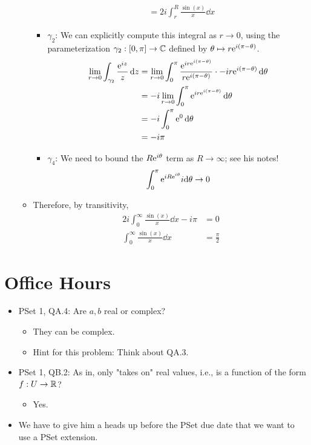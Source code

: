 \documentclass[../notes.tex]{subfiles}
\begin{document}
\begin{itemize}
\begin{itemize}
\begin{itemize}
\begin{align*}
                &= 2i\int_r^R\frac{\sin(x)}{x}\dd{x}
            \end{align*}
            \item $\gamma_2$: We can explicitly compute this integral as $r\to 0$, using the parameterization $\gamma_2:[0,\pi]\to\C$ defined by $\theta\mapsto r\e[i(\pi-\theta)]$.
            \begin{align*}
                \lim_{r\to 0}\int_{\gamma_2}\frac{\e[iz]}{z}\dd{z} &= \lim_{r\to 0}\int_0^\pi\frac{\e[{ir\e[i(\pi-\theta)]}]}{r\e[i(\pi-\theta)]}\cdot -ir\e[i(\pi-\theta)]\dd{\theta}\\
                &= -i\lim_{r\to 0}\int_0^\pi\e[{ir\e[i(\pi-\theta)]}]\dd{\theta}\\
                &= -i\int_0^\pi\e[0]\dd{\theta}\\
                &= -i\pi
            \end{align*}
            \item $\gamma_4$: We need to bound the $R\e[i\theta]$ term as $R\to\infty$; see his notes!
            \begin{equation*}
                \int_0^\pi\e[{iR\e[i\theta]}]i\dd\theta \to 0
            \end{equation*}
        \end{itemize}
        \item Therefore, by transitivity,
        \begin{align*}
            2i\int_0^\infty\frac{\sin(x)}{x}\dd{x}-i\pi &= 0\\
            \int_0^\infty\frac{\sin(x)}{x}\dd{x} &= \frac{\pi}{2}
        \end{align*}
    \end{itemize}
\end{itemize}



\section{Office Hours}
\begin{itemize}
    \item PSet 1, QA.4: Are $a,b$ real or complex?
    \begin{itemize}
        \item They can be complex.
        \item Hint for this problem: Think about QA.3.
    \end{itemize}
    \item PSet 1, QB.2: As in, only "takes on" real values, i.e., is a function of the form $f:U\to\R$?
    \begin{itemize}
        \item Yes.
    \end{itemize}
    \item We have to give him a heads up before the PSet due date that we want to use a PSet extension.
\end{itemize}
\end{document}
